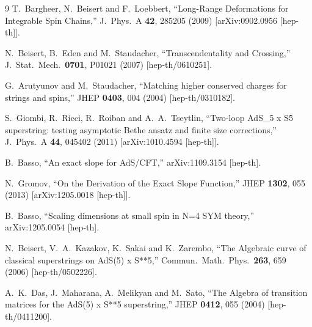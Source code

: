 \documentclass[a4paper,11pt]{article}
\numberwithin{equation}{section}
\begin{document}
\begin{thebibliography} {9}
  T.~Bargheer, N.~Beisert and F.~Loebbert,
  ``Long-Range Deformations for Integrable Spin Chains,''
  J.\ Phys.\ A {\bf 42}, 285205 (2009)
  [arXiv:0902.0956 [hep-th]].

  N.~Beisert, B.~Eden and M.~Staudacher,
  ``Transcendentality and Crossing,''
  J.\ Stat.\ Mech.\  {\bf 0701}, P01021 (2007)
  [hep-th/0610251].

  G.~Arutyunov and M.~Staudacher,
  ``Matching higher conserved charges for strings and spins,''
  JHEP {\bf 0403}, 004 (2004)
  [hep-th/0310182].

  S.~Giombi, R.~Ricci, R.~Roiban and A.~A.~Tseytlin,
  ``Two-loop AdS\_5 x S\^5 superstring: testing asymptotic Bethe ansatz and finite size corrections,''
  J.\ Phys.\ A {\bf 44}, 045402 (2011)
  [arXiv:1010.4594 [hep-th]].

  B.~Basso,
  ``An exact slope for AdS/CFT,''
  arXiv:1109.3154 [hep-th].

  N.~Gromov,
  ``On the Derivation of the Exact Slope Function,''
  JHEP {\bf 1302}, 055 (2013)
  [arXiv:1205.0018 [hep-th]].

  B.~Basso,
  ``Scaling dimensions at small spin in N=4 SYM theory,''
  arXiv:1205.0054 [hep-th].

  N.~Beisert, V.~A.~Kazakov, K.~Sakai and K.~Zarembo,
  ``The Algebraic curve of classical superstrings on AdS(5) x S**5,''
  Commun.\ Math.\ Phys.\  {\bf 263}, 659 (2006)
  [hep-th/0502226].

  A.~K.~Das, J.~Maharana, A.~Melikyan and M.~Sato,
  ``The Algebra of transition matrices for the AdS(5) x S**5 superstring,''
  JHEP {\bf 0412}, 055 (2004)
  [hep-th/0411200].


\end{thebibliography}
\end{document}
